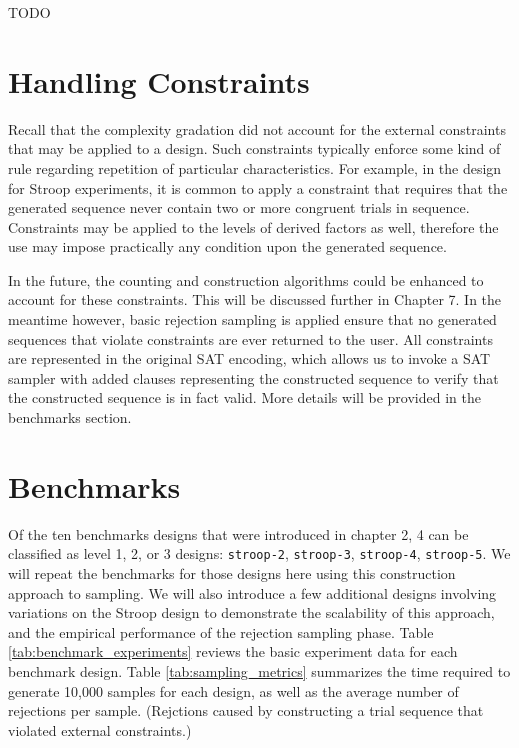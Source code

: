 TODO

\section{Handling Constraints}

Recall that the complexity gradation did not account for the external constraints that may be applied to a design. Such constraints typically enforce some kind of rule regarding repetition of particular characteristics. For example, in the design for Stroop experiments, it is common to apply a constraint that requires that the generated sequence never contain two or more congruent trials in sequence. Constraints may be applied to the levels of derived factors as well, therefore the use may impose practically any condition upon the generated sequence.

In the future, the counting and construction algorithms could be enhanced to account for these constraints. This will be discussed further in Chapter 7. In the meantime however, basic rejection sampling is applied ensure that no generated sequences that violate constraints are ever returned to the user. All constraints are represented in the original SAT encoding, which allows us to invoke a SAT sampler with added clauses representing the constructed sequence to verify that the constructed sequence is in fact valid. More details will be provided in the benchmarks section.


\section{Benchmarks}


Of the ten benchmarks designs that were introduced in chapter 2, 4 can be classified as level 1, 2, or 3 designs: \texttt{stroop-2}, \texttt{stroop-3}, \texttt{stroop-4}, \texttt{stroop-5}. We will repeat the benchmarks for those designs here using this construction approach to sampling. We will also introduce a few additional designs involving variations on the Stroop design to demonstrate the scalability of this approach, and the empirical performance of the rejection sampling phase. Table \ref{tab:benchmark_experiments} reviews the basic experiment data for each benchmark design. Table \ref{tab:sampling_metrics} summarizes the time required to generate 10,000 samples for each design, as well as the average number of rejections per sample. (Rejctions caused by constructing a trial sequence that violated external constraints.)

